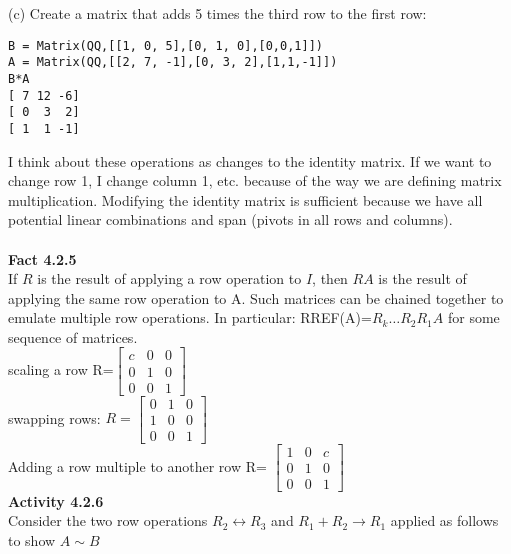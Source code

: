 \documentclass{article}
\begin{document}
(c) Create a matrix that adds 5 times the third row to the first row:
\begin{verbatim}
B = Matrix(QQ,[[1, 0, 5],[0, 1, 0],[0,0,1]])
A = Matrix(QQ,[[2, 7, -1],[0, 3, 2],[1,1,-1]])
B*A
[ 7 12 -6]
[ 0  3  2]
[ 1  1 -1]
\end{verbatim}
I think about these operations as changes to the identity matrix. If we want to change row 1, I change column 1, etc. because of the way we are defining matrix multiplication. Modifying the identity matrix is sufficient because we have all potential linear combinations and span (pivots in all rows and columns).\\
\\
\textbf{Fact 4.2.5}\\
If $R$ is the result of applying a row operation to $I$, then $RA$ is the result of applying the same row operation to A. Such matrices can be chained together to emulate multiple row operations. In particular: RREF(A)=$R_k \dots  R_2R_1A$ for some sequence of matrices.\\
scaling a row R=$
\left[\begin{array}{ccc}
c & 0 & 0 \\
0 & 1 & 0 \\
0 & 0 & 1
\end{array}\right]$\\
swapping rows: $R=
\left[\begin{array}{ccc}
0 & 1 & 0 \\
1 & 0 & 0 \\
0 & 0 & 1
\end{array}\right]$\\
Adding a row multiple to another row R=
$\left[\begin{array}{ccc}
1 & 0 & c \\
0 & 1 & 0 \\
0 & 0 & 1
\end{array}\right]$
\\
\noindent\textbf{Activity 4.2.6}\\
Consider the two row operations  $ R_2 \leftrightarrow R_3$  and $R_1 + R_2 
\to R_1$ applied as follows to show $A \sim B$
\end{document}
